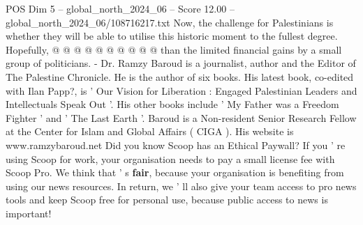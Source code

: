 \begin{textsample}{POS Dim 5 – global\_north\_2024\_06 – Score 12.00 – global\_north\_2024\_06/108716217.txt}
Now, the challenge for Palestinians is whether they will be able to utilise this historic moment to the fullest degree.
Hopefully, @ @ @ @ @ @ @ @ @ @ than the limited financial gains by a small group of politicians. - Dr.
Ramzy Baroud is a journalist, author and the Editor of The Palestine Chronicle.
He is the author of six books.
His latest book, co-edited with Ilan Papp?, is ' Our Vision for Liberation : Engaged Palestinian Leaders and Intellectuals Speak Out '.
His other books include ' My Father was a Freedom Fighter ' and ' The Last Earth '.
Baroud is a Non-resident Senior Research Fellow at the Center for Islam and Global Affairs ( CIGA ).
His website is www.ramzybaroud.net Did you know Scoop has an Ethical Paywall?
If you ' re using Scoop for work, your organisation needs to pay a small license fee with Scoop Pro.
We think that ' s \textbf{fair}, because your organisation is benefiting from using our news resources.
In return, we ' ll also give your team access to pro news tools and keep Scoop free for personal use, because public access to news is important!

\end{textsample}
